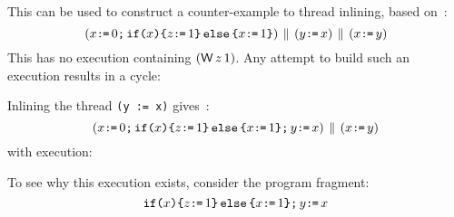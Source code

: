 This can be used to construct a counter-example to thread inlining, based on~\cite[Ex~11]{Manson:2005:JMM:1047659.1040336}:
\begin{displaymath}
  (x \GETS 0\SEMI \IF{x} \THEN z \GETS 1 \ELSE  x \GETS 1 \FI) \PAR (y \GETS x) \PAR (x \GETS y)
\end{displaymath}
This has no execution containing $(\DW z1)$. Any attempt to build such an execution
results in a cycle:
\begin{tikzdisplay}[node distance=1em]
\end{tikzdisplay}
Inlining the thread \verb|(y := x)| gives~\cite[Ex~12]{Manson:2005:JMM:1047659.1040336}:
\begin{displaymath}
  (x \GETS 0\SEMI \IF{x} \THEN z \GETS 1 \ELSE  x \GETS 1 \FI \SEMI y \GETS x) \PAR (x \GETS y)
\end{displaymath}
with execution:
\begin{tikzdisplay}[node distance=1em]
\end{tikzdisplay}
To see why this execution exists, consider the program fragment:
\begin{displaymath}
  \IF{x} \THEN z \GETS 1 \ELSE  x \GETS 1 \FI \SEMI y \GETS x
\end{displaymath}
